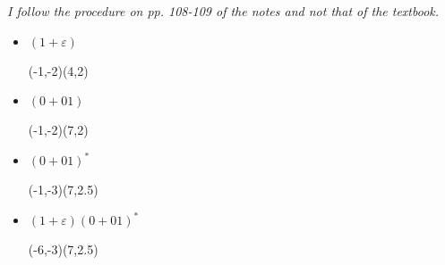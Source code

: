 \documentclass[12pt]{article}
\begin{document}
\small{\emph{I follow the procedure on pp. 108-109 of the notes and \emph{not} that of the textbook.}}
\clearpage
\begin{itemize}
\item $(1+\varepsilon)$
\begin{center}
\begin{VCPicture}{(-1,-2)(4,2)}
\SmallState
{}
%
\end{VCPicture}
\end{center}

\item $(0+01)$
\begin{center}
\begin{VCPicture}{(-1,-2)(7,2)}
\SmallState
{}
%
\end{VCPicture}
\end{center}

\item $(0+01)^*$
\begin{center}
\begin{VCPicture}{(-1,-3)(7,2.5)}
\SmallState

%
\end{VCPicture}
\end{center}

\item $(1+\varepsilon)(0+01)^*$
\begin{center}
\begin{VCPicture}{(-6,-3)(7,2.5)}
\SmallState


\end{VCPicture}
\end{center}
\end{itemize}
\end{document}
